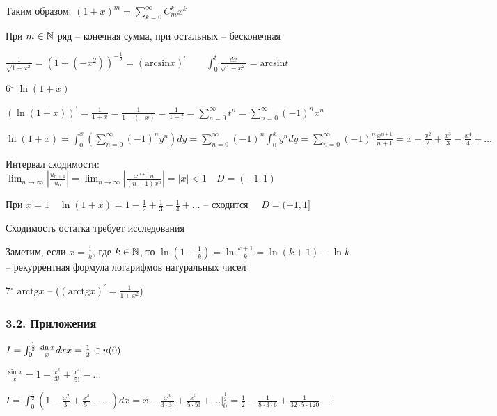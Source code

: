 \documentclass[12pt]{article}
\begin{document}
    Таким образом: $(1 + x)^m = \sum_{k = 0}^\infty C_m^k x^k$

    При $m \in \mathbb{N}$ ряд -- конечная сумма, при остальных -- бесконечная

    \Lab $\frac{1}{\sqrt{1 - x^2}} = (1 + (-x^2))^{-\frac{1}{2}} = (\mathrm{arcsin} x)^\prime \qquad \int_0^t \frac{dx}{\sqrt{1 - x^2}} = \mathrm{arcsin} t$

    \mediumvspace

    6$^\circ$ $\ln(1 + x)$

    $(\ln(1 + x))^\prime = \frac{1}{1 + x} = \frac{1}{1 - (-x)} = \frac{1}{1 - t} = \sum_{n = 0}^\infty t^n = 
    \sum_{n = 0}^\infty (-1)^n x^n$

    $\ln(1 + x) = \int_0^x (\sum_{n = 0}^\infty (-1)^n y^n) dy = \sum_{n = 0}^\infty (-1)^n \int_0^x y^n dy = 
    \sum_{n = 0}^\infty (-1)^n \frac{x^{n + 1}}{n + 1} = x - \frac{x^2}{2} + \frac{x^3}{3} - \frac{x^4}{4} + \dots$
    
    Интервал сходимости: $\lim_{n \to \infty} \left|\frac{u_{n + 1}}{u_n}\right| = 
    \lim_{n \to \infty} \left|\frac{x^{n + 1} n}{(n + 1) x^n}\right| = |x| < 1 \quad D = (-1, 1)$

    При $x = 1 \quad \ln(1 + x) = 1 - \frac{1}{2} + \frac{1}{3} - \frac{1}{4} + \dots$ -- сходится $\quad D = (-1, 1]$

    \Notas Сходимость остатка требует исследования

    \Nota Заметим, если $x = \frac{1}{k}$, где $k \in \mathbb{N}$, то $\ln(1 + \frac{1}{k}) = \ln\frac{k + 1}{k} = \ln (k + 1) - \ln k$ -- рекуррентная формула
    логарифмов натуральных чисел

    \mediumvspace

    7$^\circ$ $\mathrm{arctg} x$ -- \Lab ($(\mathrm{arctg} x)^\prime = \frac{1}{1 + x^2}$)

    \subsubsection{3.2. Приложения}

     $I = \int_0^{\frac{1}{2}} \frac{\sin x}{x} dx \hfill x = \frac{1}{2} \in u(0)$

    $\frac{\sin x}{x} = 1 - \frac{x^2}{3!} + \frac{x^4}{5!} - \dots$

    $I = \int_0^{\frac{1}{2}} (1 - \frac{x^2}{3!} + \frac{x^4}{5!} - \dots) dx = x - \frac{x^3}{3 \cdot 3!} + \frac{x^5}{5 \cdot 5!} + \dots \Big|_{0}^{\frac{1}{2}} = 
    \frac{1}{2} - \frac{1}{8 \cdot 3 \cdot 6} + \frac{1}{32 \cdot 5 \cdot 120} - \cdot$
\end{document}
